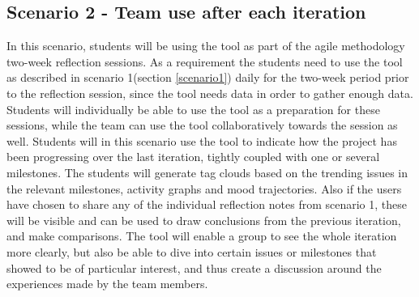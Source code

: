 \subsection{Scenario 2 - Team use after each iteration}
\label{scenario2}
In this scenario, students will be using the tool as part of the agile methodology two-week reflection sessions. As a requirement the students need to use the tool as described in scenario 1(section \ref{scenario1}) daily for the two-week period prior to the reflection session, since the tool needs data in order to gather enough data. Students will individually be able to use the tool as a preparation for these sessions, while the team can use the tool collaboratively towards the session as well.
Students will in this scenario use the tool to indicate how the project has been progressing over the last iteration, tightly coupled with one or several milestones. The students will generate tag clouds based on the trending issues in the relevant milestones, activity graphs and mood trajectories. Also if the users have chosen to share any of the individual reflection notes from scenario 1, these will be visible and can be used to draw conclusions from the previous iteration, and make comparisons. The tool will enable a group to see the whole iteration more clearly, but also be able to dive into certain issues or milestones that showed to be of particular interest, and thus create a discussion around the experiences made by the team members.  